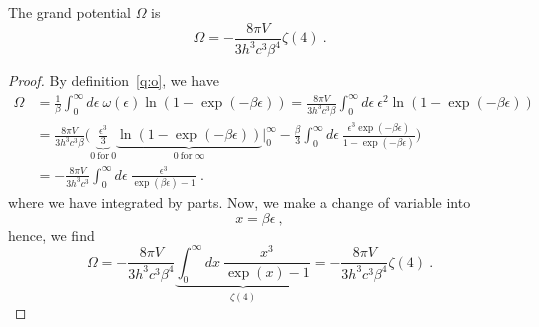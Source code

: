     The grand potential $\Omega$ is 
    \begin{equation*}
        \Omega = - \frac{8 \pi V}{3 h^3 c^3 \beta^4} \zeta(4) ~.
    \end{equation*}
    \begin{proof}
        By definition~\eqref{q:o}, we have 
        \begin{equation}
        \begin{aligned}
            \Omega & = \frac{1}{\beta} \int_0^\infty d\epsilon ~ \omega(\epsilon) \ln(1 - \exp(- \beta \epsilon)) = \frac{8 \pi V}{3 h^3 c^3 \beta} \int_0^\infty d\epsilon ~ \epsilon^2 \ln(1 - \exp(- \beta \epsilon)) \\ & = \frac{8 \pi V}{3 h^3 c^3 \beta} \Big ( \underbrace{\frac{\epsilon^3}{3} }_{0 ~ \text{for} ~ 0}\underbrace{\ln(1 - \exp(- \beta \epsilon)) }_{0 ~ \text{for} ~ \infty} \Big \vert_0^\infty - \frac{\beta}{3} \int_0^\infty d\epsilon ~ \frac{\epsilon^3 \exp(- \beta \epsilon)}{1 - \exp(- \beta \epsilon)} \Big) \\ & = - \frac{8 \pi V}{3 h^3 c^3} \int_0^\infty d\epsilon ~ \frac{\epsilon^3}{\exp(\beta \epsilon) - 1} ~.
        \end{aligned}
        \end{equation}
        where we have integrated by parts. Now, we make a change of variable into 
        \begin{equation}
            x = \beta \epsilon ~,
        \end{equation}
        hence, we find 
        \begin{equation*}
        \Omega = - \frac{8 \pi V}{3 h^3 c^3 \beta^4} \underbrace{\int_0^\infty dx ~ \frac{x^3}{\exp(x) - 1}}_{\zeta(4)} = - \frac{8 \pi V}{3 h^3 c^3 \beta^4} \zeta(4) ~.
        \end{equation*}
    \end{proof}

